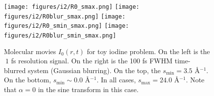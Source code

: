 \documentclass[fleqn,oneside,12pt]{article}
\begin{document}
\begin{figure}[h!]
\begin{center}
\texttt{[image: figures/i2/R0\_smax.png]}
\texttt{[image: figures/i2/R0blur\_smax.png]}
\texttt{[image: figures/i2/R0\_smin\_smax.png]}
\texttt{[image: figures/i2/R0blur\_smin\_smax.png]}
\caption{Molecular movies $I_0(r, t)$ for toy iodine problem.  On the left is the
$~1$ fs resolution signal. On the right is the 100 fs FWHM time-blurred system
(Gaussian blurring). On the top, the $s_{\mathrm{min}} = 3.5$ \AA{}$^{-1}$. On
the bottom, $s_{\mathrm{min}} \sim 0.0$ \AA{}$^{-1}$. In all cases,
$s_{\mathrm{max}} = 24.0$ \AA{}$^{-1}$. Note that $\alpha = 0$ in the sine
transform in this case.
}
\label{fig:IR2}
\end{center}
\end{figure}
\end{document}
